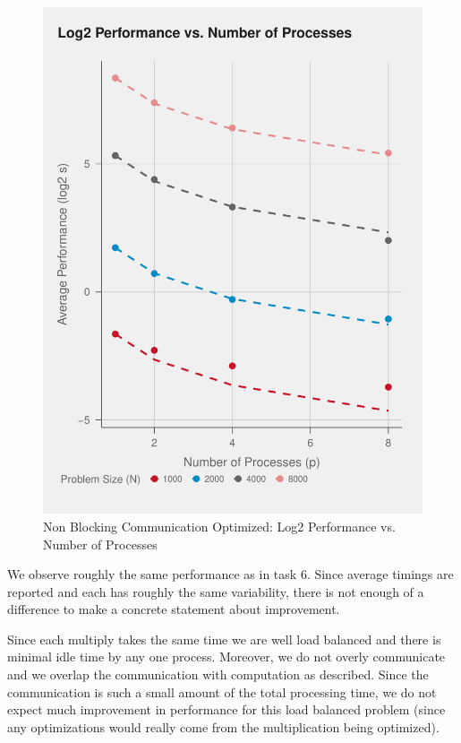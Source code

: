 \documentclass{article}
\begin{document}
\begin{figure}[H]
    \centering
    \includegraphics[scale=0.7]{../part2/out/np-7.pdf} 
    \caption{Non Blocking Communication Optimized: Log2 Performance vs. Number of Processes}
 \end{figure}
\noindent We observe roughly the same performance as in task 6. Since average timings are reported 
and each has roughly the same variability, there is not enough of a difference to make a concrete statement 
about improvement. 

Since each multiply takes the same time we are well load balanced and there is minimal idle time by any one process. Moreover, 
we do not overly communicate and we overlap the communication with computation as described. 
Since the communication is such a small amount of the total processing time, we do not expect 
much improvement in performance for this load balanced problem (since any optimizations 
would really come from the multiplication being optimized).
\end{document}
